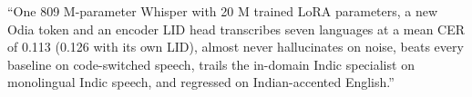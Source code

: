 \begin{vivatip}
``One 809 M-parameter Whisper with 20 M trained LoRA parameters, a new Odia token and an encoder LID head transcribes seven
languages at a mean CER of 0.113 (0.126 with its own LID), almost never hallucinates on noise, beats every baseline on code-switched
speech, trails the in-domain Indic specialist on monolingual Indic speech, and regressed on Indian-accented English.''
\end{vivatip}

